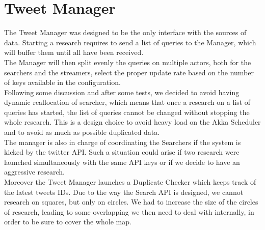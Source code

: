 \section{Tweet Manager}

The Tweet Manager was designed to be the only interface with the sources of data. Starting a research requires to send a list of queries to the Manager, which will buffer them until all have been received. \\
The Manager will then split evenly the queries on multiple actors, both for the searchers and the streamers, select the proper update rate based on the number of keys available in the configuration. \\
Following some discussion and after some tests, we decided to avoid having dynamic reallocation of searcher, which means that once a research on a list of queries has started, the list of queries cannot be changed without stopping the whole research. This is a design choice to avoid heavy load on the Akka Scheduler and to avoid as much as possible duplicated data.\\
The manager is also in charge of coordinating the Searchers if the system is kicked by the twitter API. Such a situation could arise if two research were launched simultaneously with the same API keys or if we decide to have an aggressive research. \\

Moreover the Tweet Manager launches a Duplicate Checker which keeps track of the latest tweets IDs. Due to the way the Search API is designed, we cannot research on squares, but only on circles. We had to increase the size of the circles of research, leading to some overlapping we then need to deal with internally, in order to be sure to cover the whole map.